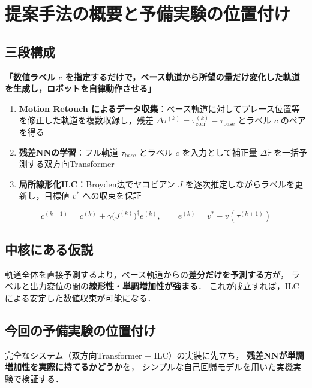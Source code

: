 \section{提案手法の概要と予備実験の位置付け}

\subsection{三段構成}

\begin{center}
  \textbf{「数値ラベル $c$ を指定するだけで，ベース軌道から所望の量だけ変化した軌道を生成し，ロボットを自律動作させる」}
\end{center}


\begin{enumerate}
  \item \textbf{Motion Retouch によるデータ収集}：ベース軌道に対してプレース位置等を修正した軌道を複数収録し，残差 $\Delta\tau^{(k)} = \tau^{(k)}_\mathrm{corr} - \tau_\mathrm{base}$ とラベル $c$ のペアを得る
  \item \textbf{残差NNの学習}：フル軌道 $\tau_\mathrm{base}$ とラベル $c$ を入力として補正量 $\Delta\tilde{\tau}$ を一括予測する双方向Transformer
  \item \textbf{局所線形化ILC}：Broyden法でヤコビアン $J$ を逐次推定しながらラベルを更新し，目標値 $v^*$ への収束を保証
\end{enumerate}

$$c^{(k+1)} = c^{(k)} + \gamma \bigl(J^{(k)}\bigr)^\dagger e^{(k)}, \qquad e^{(k)} = v^* - v\!\left(\tau^{(k+1)}\right)$$

\subsection{中核にある仮説}

軌道全体を直接予測するより，ベース軌道からの\textbf{差分だけを予測する}方が，
ラベルと出力変位の間の\textbf{線形性・単調増加性が強まる}．
これが成立すれば，ILCによる安定した数値収束が可能になる．

\subsection{今回の予備実験の位置付け}

完全なシステム（双方向Transformer + ILC）の実装に先立ち，
\textbf{残差NNが単調増加性を実際に持てるかどうか}を，
シンプルな自己回帰モデルを用いた実機実験で検証する．

\begin{center}
  \fboxsep=5pt
\end{center}

